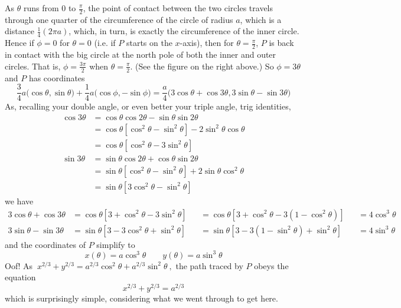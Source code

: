 As $\theta$ runs from 0 to $\frac{\pi}{2}$, the point of contact
between the two circles travels through one quarter of the circumference
of the circle of radius $a$, which is a distance $\frac{1}{4}(2\pi a)$, 
which, in turn, is exactly the circumference of the inner circle. 
Hence if $\phi=0$ for $\theta=0$ (i.e. if $P$ starts on the $x$-axis), 
then for $\theta=\frac{\pi}{2}$, $P$ is back in contact with the big 
circle at the north pole of both the inner and outer circles. 
That is, $\phi=\frac{3\pi}{2}$ when $\theta=\frac{\pi}{2}$. 
(See the figure on the right above.) 
So $\phi=3\theta$  and $P$ has coordinates
\begin{equation*}
\frac{3}{4}a\big(\cos\theta,\sin\theta\big)
+\frac{1}{4}a\big(\cos\phi,-\sin\phi\big)
=\frac{a}{4}\big(3\cos\theta+\cos 3\theta,3\sin\theta-\sin 3\theta\big)
\end{equation*}
As, recalling your double angle, or even better your triple angle, 
trig identities,
\begin{align*}
\cos3\theta&=\cos\theta\cos2\theta-\sin\theta\sin 2\theta\\
&=\cos\theta[\cos^2\theta-\sin^2\theta]-2\sin^2\theta\cos\theta\\
&=\cos\theta[\cos^2\theta-3\sin^2\theta]\\
\sin3\theta&=\sin\theta\cos2\theta+\cos\theta\sin 2\theta\\
&=\sin\theta[\cos^2\theta-\sin^2\theta]+2\sin\theta\cos^2\theta\\
&=\sin\theta[3\cos^2\theta-\sin^2\theta]
\end{align*}
we have
\begin{equation*}
\begin{alignedat}{3}
3\cos\theta+\cos 3\theta
   &=\cos\theta[3+\cos^2\theta-3\sin^2\theta] &
   &=\cos\theta[3+\cos^2\theta-3(1-\cos^2\theta)] &
   &=4\cos^3\theta\\
3\sin\theta-\sin 3\theta
   &=\sin\theta[3-3\cos^2\theta+\sin^2\theta] &
   &=\sin\theta[3-3(1-\sin^2\theta)+\sin^2\theta] &
   &=4\sin^3\theta
\end{alignedat}
\end{equation*}
and the coordinates of $P$ simplify to
\begin{equation*}
x(\theta)= a\cos^3\theta\qquad y(\theta)=a\sin^3\theta
\end{equation*}
Oof! As
$\ 
x^{2/3}+y^{2/3}=a^{2/3}\cos^2\theta+a^{2/3}\sin^2\theta 
\ ,$
the path traced by $P$ obeys the equation
\begin{equation*}
x^{2/3}+y^{2/3} =a^{2/3}
\end{equation*}
which is surprisingly simple, considering what we went through to get here.


